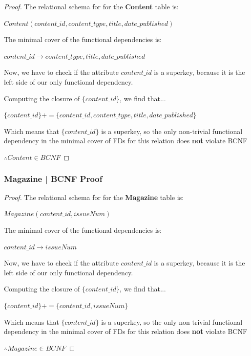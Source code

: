 \documentclass[letter, 12pt, titlepage]{article}
\begin{document}
\begin{proof}


	The relational schema for for the \textbf{Content} table is:


	$Content(content\_id, content\_type, title, date\_published)$


	The minimal cover of the functional dependencies is:


	$ content\_id \rightarrow content\_type, title, date\_published $


	Now, we have to check if the attribute $content\_id$ is a superkey, because it is the left side of our only functional dependency.


	Computing the closure of $\{content\_id\}$, we find that...

	$\{content\_id\}+ = \{content\_id, content\_type, title, date\_published  \} $

	Which means that $\{content\_id\}$ is a superkey, so the only non-trivial functional dependency in the minimal cover of FDs for this relation does \textbf{not} violate BCNF

	$\therefore Content \in BCNF $
\end{proof}

\subsubsection{Magazine | BCNF Proof }

\begin{proof}


	The relational schema for for the \textbf{Magazine} table is:


	$Magazine(content\_id, issueNum)$


	The minimal cover of the functional dependencies is:


	$ content\_id \rightarrow issueNum $


	Now, we have to check if the attribute $content\_id$ is a superkey, because it is the left side of our only functional dependency.


	Computing the closure of $\{content\_id\}$, we find that...

	$\{content\_id\}+ = \{content\_id, issueNum  \} $

	Which means that $\{content\_id\}$ is a superkey, so the only non-trivial functional dependency in the minimal cover of FDs for this relation does \textbf{not} violate BCNF

	$\therefore Magazine \in BCNF $

\end{proof}
\end{document}
